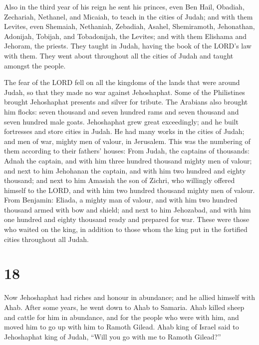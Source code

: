  Also in the third year of his reign he sent his princes,
even Ben Hail, Obadiah, Zechariah, Nethanel, and Micaiah, to teach in
the cities of Judah;  and with them Levites, even
Shemaiah, Nethaniah, Zebadiah, Asahel, Shemiramoth, Jehonathan,
Adonijah, Tobijah, and Tobadonijah, the Levites; and with them Elishama
and Jehoram, the priests.  They taught in Judah, having
the book of the LORD's law with them. They went about throughout all the
cities of Judah and taught amongst the people.

 The fear of the LORD fell on all the kingdoms of the
lands that were around Judah, so that they made no war against
Jehoshaphat.  Some of the Philistines brought Jehoshaphat
presents and silver for tribute. The Arabians also brought him flocks:
seven thousand and seven hundred rams and seven thousand and seven
hundred male goats.  Jehoshaphat grew great exceedingly;
and he built fortresses and store cities in Judah.  He
had many works in the cities of Judah; and men of war, mighty men of
valour, in Jerusalem.  This was the numbering of them
according to their fathers' houses: From Judah, the captains of
thousands: Adnah the captain, and with him three hundred thousand mighty
men of valour;  and next to him Jehohanan the captain,
and with him two hundred and eighty thousand;  and next
to him Amasiah the son of Zichri, who willingly offered himself to the
LORD, and with him two hundred thousand mighty men of valour.
 From Benjamin: Eliada, a mighty man of valour, and with
him two hundred thousand armed with bow and shield;  and
next to him Jehozabad, and with him one hundred and eighty thousand
ready and prepared for war.  These were those who waited
on the king, in addition to those whom the king put in the fortified
cities throughout all Judah.

\hypertarget{section-17}{%
\section{18}\label{section-17}}

 Now Jehoshaphat had riches and honour in abundance; and
he allied himself with Ahab.  After some years, he went
down to Ahab to Samaria. Ahab killed sheep and cattle for him in
abundance, and for the people who were with him, and moved him to go up
with him to Ramoth Gilead.  Ahab king of Israel said to
Jehoshaphat king of Judah, ``Will you go with me to Ramoth Gilead?''

